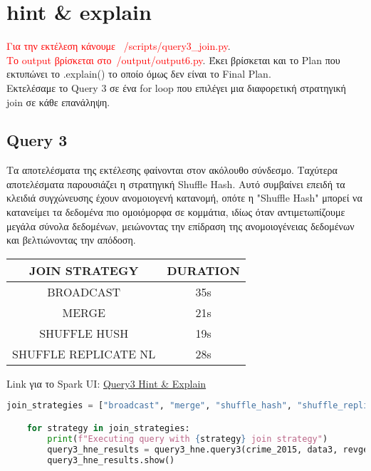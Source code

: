 \documentclass{article}
\begin{document}
\vspace{3\baselineskip}
\section{hint \& explain}

\textcolor{red}{Για την εκτέλεση κάνουμε  /scripts/query3_join.py}.  \\
\textcolor{red}{Το output βρίσκεται στο /output/output6.py}. Έκει βρίσκεται και το Plan που εκτυπώνει το .explain() το οποίο όμως δεν είναι το Final Plan. \\ 
Εκτελέσαμε το Query 3 σε ένα for loop που επιλέγει μια διαφορετική στρατηγική join σε 
κάθε επανάληψη.

\subsection*{Query 3}

Τα αποτελέσματα της εκτέλεσης φαίνονται στον ακόλουθο σύνδεσμο. Ταχύτερα αποτελέσματα 
παρουσιάζει η στρατηγική Shuffle Hash. Αυτό συμβαίνει επειδή τα κλειδιά συγχώνευσης έχουν 
ανομοιογενή κατανομή, οπότε η "Shuffle Hash" μπορεί να κατανείμει τα δεδομένα πιο ομοιόμορφα σε κομμάτια, ιδίως όταν αντιμετωπίζουμε μεγάλα σύνολα δεδομένων, μειώνοντας την επίδραση της ανομοιογένειας δεδομένων και βελτιώνοντας την απόδοση.\\

\begin{center}
\begin{tabular}{|c|c|}
\hline
\textbf{JOIN STRATEGY} & \textbf{DURATION} \\
\hline
BROADCAST & 35s \\
\hline
MERGE & 21s \\
\hline
SHUFFLE HUSH & 19s \\
\hline
SHUFFLE REPLICATE NL & 28s \\
\hline
\end{tabular}
\end{center} 

\vspace{3\baselineskip}

Link για το Spark UI:
\href{http://83.212.81.191:18080/history/application_1705357398960_0018/jobs/} {Query3 Hint \& Explain}
\begin{lstlisting}[language = Python]
    join_strategies = ["broadcast", "merge", "shuffle_hash", "shuffle_replicate_nl"]

    for strategy in join_strategies:
        print(f"Executing query with {strategy} join strategy")
        query3_hne_results = query3_hne.query3(crime_2015, data3, revgecoding, strategy)
        query3_hne_results.show()
\end{lstlisting}
\end{document}
